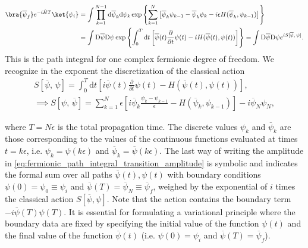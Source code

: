 \begin{equation}
    \begin{aligned}
        \bra{\overline{\psi}_f} e^{-i \hat{H} T} \ket{\psi_i} & = \int \prod_{k=1}^{N-1} \mathrm{d} \overline{\psi}_k \mathrm{d} \psi_k \exp\left\{ \sum_{k=1}^{N} \left[ \overline{\psi}_k \psi_{k-1} - \overline{\psi}_k \psi_k - i \epsilon H(\overline{\psi}_k, \psi_{k-1}) \right] \right\}                                                        \\
                                                              & = \int \mathrm{D} \overline{\psi} \mathrm{D} \psi \exp\left\{ \int_0^T \mathrm{d}t \left[ \overline{\psi}(t) \frac{\partial}{\partial t} \psi(t) - i H(\overline{\psi}(t), \psi(t)) \right] \right\} = \int \mathrm{D} \overline{\psi} \mathrm{D} \psi e^{i S[\overline{\psi},\,\psi]}.
    \end{aligned}
    \label{eq:fermionic_path_integral_transition_amplitude}
\end{equation}
This is the path integral for one complex fermionic degree of freedom. We recognize in the exponent the discretization of the classical action
\[
    \begin{aligned}
        S[\overline{\psi},\,\psi] = \int_0^T \mathrm{d}t \left[ i \overline{\psi}(t) \frac{\partial}{\partial t} \psi(t) - H(\overline{\psi}(t), \psi(t)) \right], \\
        \implies S[\psi,\,\overline{\psi}] = \sum_{k=1}^N \epsilon \left[ i \overline{\psi}_k \frac{\psi_k - \psi_{k-1}}{\epsilon} - H(\overline{\psi}_{k}, \psi_{k-1}) \right] -i \overline{\psi}_N \psi_N,
    \end{aligned}
\]

where \(T = N \epsilon\) is the total propagation time. The discrete values \(\psi_k\) and \(\overline{\psi}_k\) are those corresponding to the values of the continuous functions evaluated at times \(t = k\epsilon\), i.e. \(\psi_k = \psi(k\epsilon)\) and \(\overline{\psi}_k = \overline{\psi}(k\epsilon)\). The last way of writing the amplitude in \eqref{eq:fermionic_path_integral_transition_amplitude} is symbolic and indicates the formal sum over all paths \(\overline{\psi}(t), \psi(t)\) with boundary conditions \(\psi(0) = \psi_0 \equiv \psi_i\) and \(\overline{\psi}(T ) = \overline{\psi}_N \equiv \overline{\psi}_f\), weighed by the exponential of \(i\) times the classical action \(S[\overline{\psi}, \psi]\). Note that the action contains the boundary term \(-i \overline{\psi}(T) \psi(T)\). It is essential for formulating a variational principle where the boundary data are fixed by specifying the initial value of the function \(\psi(t)\) and the final value of the function \(\overline{\psi}(t)\) (i.e. \(\psi(0) = \psi_i\) and \(\overline{\psi}(T ) = \overline{\psi}_f\)).

